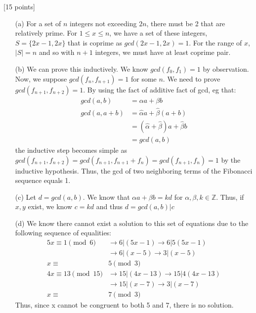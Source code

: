 \documentclass[11pt]{article}
\newcounter{qnum}
\newcommand{\question}[1]{\stepcounter{qnum}\bigskip\noindent{\bf \arabic{qnum}. #1.}}
\begin{document}
\question{Number Theory II} [15 points]
\begin{itemize}
  \item[(a)]  For a set of $n$ integers not exceeding $2n$, there must be 2 that are relatively 
    prime.   For $1 \leq x \leq n$, we have a set of these integers, $S = \{2x-1, 2x\}$ that 
    is coprime as $gcd(2x-1, 2x) =1$. For the range of $x$, $|S| = n$ and so with $n+1$ integers, 
    we must have at least coprime pair.
  \item[(b)] We can prove this inductively. We know $gcd(f_0, f_1) =1$ by observation. Now, we 
    suppose $gcd(f_n, f_{n+1}) =1$ for some $n$. We need to prove $gcd(f_{n+1}, f_{n+2})=1$. 
    By using the fact of additive fact of gcd, eg that:
    \begin{align}
      gcd(a,b) &= \alpha a + \beta b \nonumber \\
      gcd(a, a+b) &= \hat \alpha a + \hat \beta (a + b) \nonumber \\
                  &= (\hat \alpha + \hat \beta) a + \hat \beta b \nonumber \\
                  &= gcd(a,b) \nonumber
    \end{align}
  the inductive step becomes simple as 
  $gcd(f_{n+1}, f_{n+2}) = gcd(f_{n+1}, f_{n+1} + f_n) = gcd(f_{n+1}, f_n) = 1$ by the inductive
  hypothesis. Thus, the gcd of two neighboring terms of the Fibonacci sequence equals 1.
\item[(c)] Let $d = gcd(a,b).$ We know that $\alpha a + \beta b = kd$ for 
  $\alpha, \beta, k \in \mathbb{Z}$. 
  Thus, if $x,y$ exist, we know $c=kd$ and thus $d = gcd(a,b) | c$
  \item[(d)] We know there cannot exist a solution to this set of equations due to the following 
    sequence of equalities:
    \begin{align}
      5x \equiv 1 \pmod{6} &\rightarrow 6|(5x-1) \rightarrow 6|5(5x-1) \nonumber \\
                           &\rightarrow 6|(x-5) \rightarrow 3|(x-5) \nonumber \\
      x \equiv& 5 \pmod{3} \nonumber \\
      4x \equiv 13 \pmod{15} &\rightarrow 15|(4x-13) \rightarrow 15|4(4x-13) \nonumber \\
                           &\rightarrow 15|(x-7) \rightarrow 3|(x-7) \nonumber \\
        x \equiv& 7 \pmod{3} \nonumber 
    \end{align}
    Thus, since x cannot be congruent to both 5 and 7, there is no solution.
\end{itemize}
\end{document}
